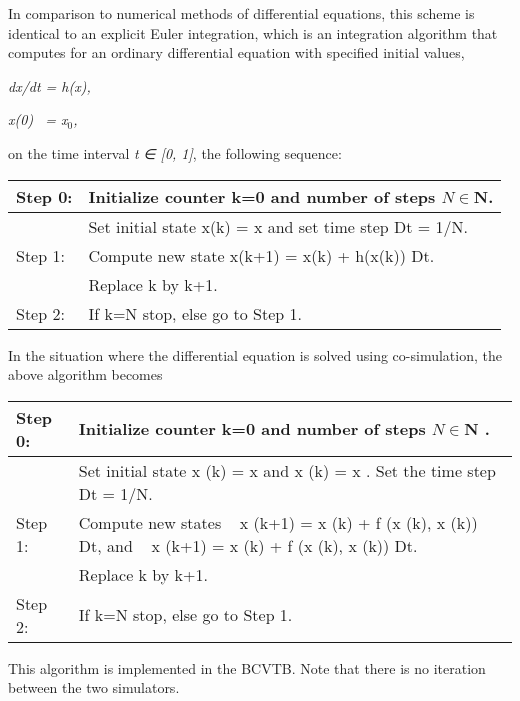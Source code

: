 In comparison to numerical methods of differential equations, this scheme is identical to an explicit Euler integration, which is an integration algorithm that computes for an ordinary differential equation with specified initial values,

\emph{dx/dt = h(x),}

\emph{x(0)~ = x\(_{0}\),}

on the time interval \emph{t} \emph{∈ {[}0, 1{]}}, the following sequence:

\begin{longtable}[c]{p{1.5in}p{4.5in}}

\toprule 
Step 0: & Initialize counter k=0 and number of steps \(N \in \mathbf{N}\). \tabularnewline
\endhead

~ & Set initial state x(k) = x and set time step Dt = 1/N. \tabularnewline
Step 1: & Compute new state x(k+1) = x(k) + h(x(k)) Dt. \tabularnewline
~ & Replace k by k+1. \tabularnewline
Step 2: & If k=N stop, else go to Step 1. \tabularnewline
\bottomrule
\end{longtable}

In the situation where the differential equation is solved using co-simulation, the above algorithm becomes

\begin{longtable}[c]{p{1.5in}p{4.5in}}

\toprule 
Step 0: & Initialize counter k=0 and number of steps $N \in \mathbf{N}$ . \tabularnewline
\endhead

~ & Set initial state x  (k) = x   and x  (k) = x  . Set the time step Dt = 1/N. \tabularnewline
Step 1: & Compute new states ~ x  (k+1) = x  (k) + f  (x  (k), x  (k)) Dt, and ~ x  (k+1) = x  (k) + f  (x  (k), x  (k)) Dt. \tabularnewline
~ & Replace k by k+1. \tabularnewline
Step 2: & If k=N stop, else go to Step 1. \tabularnewline
\bottomrule
\end{longtable}

This algorithm is implemented in the BCVTB. Note that there is no iteration between the two simulators.
